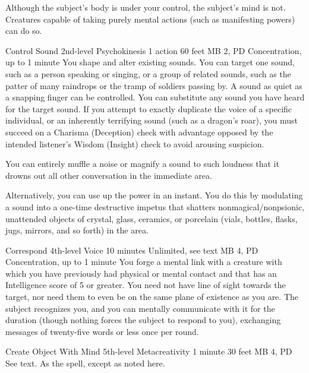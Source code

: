   Although the subject's body is under your control,
  the subject's mind is not.
  Creatures capable of taking purely mental actions
  (such as manifesting powers)
  can do so.

\DndPowerHeader%
  {Control Sound}
  {2nd-level Psychokinesis}
  {1 action}
  {60 feet}
  {MB 2, PD \lvltwo}
  {Concentration, up to 1 minute}
  You shape and alter existing sounds.
  You can target one sound, such as a person speaking or singing,
  or a group of related sounds,
  such as the patter of many raindrops or the tramp of soldiers passing by.
  A sound as quiet as a snapping finger can be controlled.
  You can substitute any sound you have heard for the target sound.
  If you attempt to exactly duplicate the voice of a specific individual,
  or an inherently terrifying sound (such as a dragon's roar),
  you must succeed on a Charisma (Deception) check with advantage
  opposed by the intended listener's Wisdom (Insight) check
  to avoid arousing suspicion.

  You can entirely muffle a noise or magnify a sound to such loudness
  that it drowns out all other conversation in the immediate area.
  
  Alternatively, you can use up the power in an instant.
  You do this by modulating a sound into a one-time destructive impetus
  that shatters nonmagical/nonpsionic,
  unattended objects of crystal, glass, ceramics, or porcelain
  (vials, bottles, flasks, jugs, mirrors, and so forth) in the area.

\DndPowerHeader%
  {Correspond}
  {4th-level Voice}
  {10 minutes}
  {Unlimited, see text}
  {MB 4, PD \lvlfour}
  {Concentration, up to 1 minute}
  You forge a mental link with a creature with which you have
  previously had physical or mental contact
  and that has an Intelligence score of 5 or greater.
  You need not have line of sight towards the target,
  nor need them to even be on the same
  plane of existence as you are.
  The subject recognizes you, and you can mentally communicate
  with it for the duration
  (though nothing forces the subject to respond to you),
  exchanging messages of twenty-five words or less once per round.

\DndPowerHeader%
  {Create Object With Mind}
  {5th-level Metacreativity}
  {1 minute}
  {30 feet}
  {MB 4, PD \lvlfive}
  {See text.}
As the  spell,
except as noted here.

